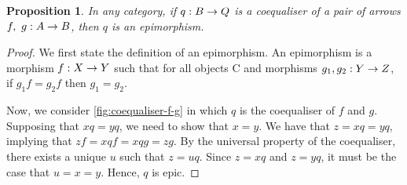 \documentclass[12pt,twoside,maitrise]{dms}
\newtheorem{prop}[cor]{Proposition}
\theoremstyle{definition}
\numberwithin{equation}{section}
\numberwithin{table}{chapter}
\numberwithin{figure}{chapter}
\begin{document}
\begin{prop}
In any category, if $\oftype{q}{B \rightarrow Q}$ is a coequaliser of a pair of
arrows $\oftype{f, \ g}{A \rightarrow B}$, then $q$ is an epimorphism.
\end{prop}

\begin{proof}
We first state the definition of an epimorphism. An epimorphism is a morphism $\oftype{f}{X \rightarrow Y}$ such that for all objects C and morphisms $\oftype{g_1, g_2}{Y \rightarrow Z}$, if $g_1f = g_2f$ then $g_1 = g_2$.

Now, we consider \autoref{fig:coequaliser-f-g} in which $q$ is the coequaliser of $f$ and
$g$. Supposing that $xq = yq$, we need to show that $x = y$. We have that $z =
xq = yq$, implying that $zf = xqf = xqg = zg$. By the universal property of the
coequaliser, there exists a unique $u$ such that $z = uq$. Since $z = xq$ and $z
= yq$, it must be the case that $u = x = y$. Hence, $q$ is epic.
\end{proof}
\end{document}

